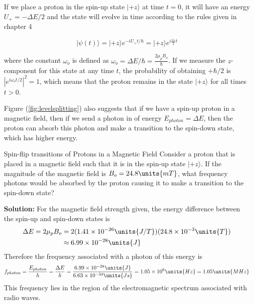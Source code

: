 If we place a proton in the spin-up state $|\mbox{$+z$}\rangle$ at time $t=0$, it will have an energy $U_+ = -\Delta E/2$ and the state will evolve in time according to the rules given in chapter 4

\begin{equation}
|\mbox{$\psi(t)$}\rangle = |\mbox{$+z$}\rangle e^{-iU_+t/\hbar} = |\mbox{$+z$}\rangle e^{i\frac{\omega_o}{2}t}
\end{equation}

\noindent where the constant $\omega_o$ is defined as $\omega_o = \Delta E/\hbar = \frac{2 \mu_p B_o}{\hbar}$.  If we measure the $z$-component for this state at any time $t$, the probability of obtaining $+\hbar/2$ is $|e^{i\omega_o t/2}|^2 = 1$, which means that the proton remains in the state $|\mbox{$+z$}\rangle$ for all times $t > 0$.

Figure (\ref{fig:levelsplitting}) also suggests that if we have a spin-up proton in a magnetic field, then if we send a photon in of energy $E_{photon} = \Delta E$, then the proton can absorb this photon and make a transition to the spin-down state, which has higher energy.

\begin{example}{Spin-flip transitions of Protons in a Magnetic Field} 
\label{example:spinFlip}
Consider a proton that is placed in a magnetic field such that it is in the spin-up state $|\mbox{$+z$}\rangle$. If the magnitude of the magnetic field is $B_o = 24.8 \units{mT}$, what frequency photons would be absorbed by the proton causing it to make a transition to the spin-down state?

{\bf Solution:} For the magnetic field strength given, the energy difference between the spin-up and spin-down states is 
\begin{eqnarray}
\Delta E = 2 \mu_p B_o & = 2 (1.41 \times 10^{-26} \units{J/T}) (24.8 \times 10^{-3} \units{T}) \nonumber \\
 & \approx 6.99 \times 10^{-28} \units{J}
\end{eqnarray}
Therefore the frequency associated with a photon of this energy is
\begin{equation}
f_{photon} = \frac{E_{photon}}{h} = \frac{\Delta E}{h} 
  = \frac{6.99 \times 10^{-28} \units{J}}{6.63 \times 10^{-34} \units{J s}} = 1.05 \times 10^{6} \units{Hz} = 1.05 \units{MHz} \nonumber
\end{equation}
This frequency lies in the region of the electromagnetic spectrum associated with radio waves.
\end{example}

